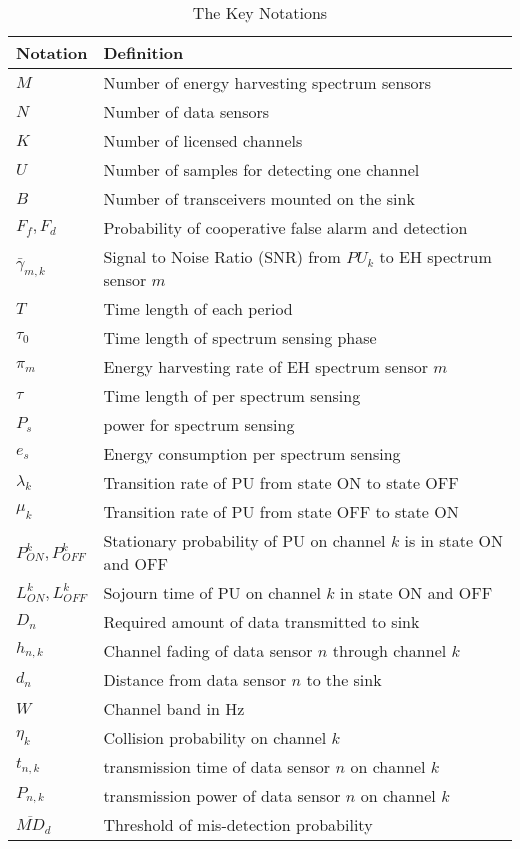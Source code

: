 \documentclass[journal]{IEEEtran} \ifCLASSINFOpdf
\begin{document}
\begin{table}[!t]
    \caption{The Key Notations}
    \centering
    \small
    \begin{tabular}{p{1.5cm}|p{6.6cm}}
         \hline
         \hline \textbf{Notation} & \textbf{Definition} \\
         \hline
         \hline
         $M$ & Number of energy harvesting spectrum sensors \\
         $N$ & Number of data sensors\\
         $K$ & Number of licensed channels\\
         $U$ & Number of samples for detecting one channel\\
         $B$ & Number of transceivers mounted on the sink \\
         $F_f, F_d$ & Probability of cooperative false alarm and detection\\
         $\bar{\gamma}_{m,k}$ & Signal to Noise Ratio (SNR) from $PU_k$ to EH spectrum sensor $m$  \\
         $T$ & Time length of each period\\
         $\tau_0$ & Time length of spectrum sensing phase\\
         $\pi_m$ & Energy harvesting rate of EH spectrum sensor $m$ \\
         $\tau$ & Time length of per spectrum sensing  \\
         $P_s$ & power for spectrum sensing\\
         $e_s$ & Energy consumption per spectrum sensing \\
         $\lambda_k$ &  Transition rate of PU from state ON to state OFF\\
         $\mu_k$ &  Transition rate of PU from state OFF to state ON \\
         $P_{ON}^k, P_{OFF}^k$ &  Stationary probability of PU on channel $k$ is in state ON and OFF \\
         $L_{ON}^k, L_{OFF}^k$ &  Sojourn time of PU on channel $k$ in state ON and OFF   \\
         $D_n$ & Required amount of data transmitted to sink\\
         $h_{n,k}$ & Channel fading of data sensor $n$ through channel $k$\\
         $d_n$ & Distance from data sensor $n$ to the sink\\
         $W$ &  Channel band in Hz\\
         $\eta_k$ & Collision probability on channel $k$ \\
         $t_{n,k}$ &  transmission time of data sensor $n$ on channel $k$\\
         $P_{n,k}$ &  transmission power of data sensor $n$ on channel $k$\\
         $\overline{MD}_d$ & Threshold of mis-detection probability \\
         \hline
    \end{tabular}
    \label{tab_symbol}
\end{table}
\end{document}
